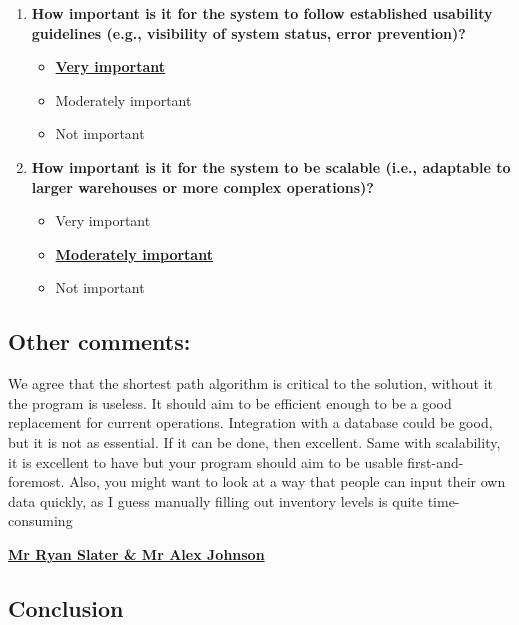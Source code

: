 \begin{enumerate}
    \item \textbf{How important is it for the system to follow established usability guidelines (e.g., visibility of system status, error prevention)?}
    \begin{itemize}
        \item \textbf{\underline{Very important}}
        \item Moderately important
        \item Not important
    \end{itemize}

    \item \textbf{How important is it for the system to be scalable (i.e., adaptable to larger warehouses or more complex operations)?}
    \begin{itemize}
        \item Very important
        \item \textbf{\underline{Moderately important}}
        \item Not important
    \end{itemize}
\end{enumerate}

\subsection*{Other comments:}

We agree that the shortest path algorithm is critical to the solution, without it the program is useless. It should aim to be efficient enough to be a good replacement for current operations. Integration with a database could be good, but it is not as essential. If it can be done, then excellent. Same with scalability, it is excellent to have but your program should aim to be usable first-and-foremost. Also, you might want to look at a way that people can input their own data quickly, as I guess manually filling out inventory levels is quite time-consuming
\vspace{0.7cm}
\newline

\textbf{\underline{Mr Ryan Slater \& Mr Alex Johnson}} \newline


\newpage

\subsection{Conclusion}

